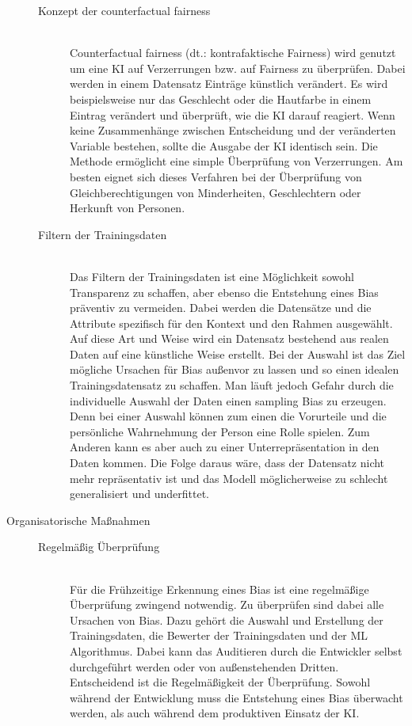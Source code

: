 \begin{onehalfspace}
\begin{description}
\begin{description}
                \item[Konzept der \glqq{}counterfactual fairness\grqq{}] \hfill \\
                \glqq{}Counterfactual fairness\grqq{} (\ac*{dt}.: kontrafaktische Fairness) wird genutzt um eine \ac*{KI} auf Verzerrungen bzw. auf Fairness zu überprüfen. Dabei werden in einem Datensatz Einträge künstlich verändert. Es wird beispielsweise nur das Geschlecht oder die Hautfarbe in einem Eintrag verändert und überprüft, wie die \ac*{KI} darauf reagiert. Wenn keine Zusammenhänge zwischen Entscheidung und der veränderten Variable bestehen, sollte die Ausgabe der \ac*{KI} identisch sein. Die Methode ermöglicht eine simple Überprüfung von Verzerrungen. Am besten eignet sich dieses Verfahren bei der Überprüfung von Gleichberechtigungen von Minderheiten, Geschlechtern oder Herkunft von Personen.\cite{hagendorff2019maschinelles}

                \item[Filtern der Trainingsdaten] \hfill \\
                Das Filtern der Trainingsdaten ist eine Möglichkeit sowohl Transparenz zu schaffen, aber ebenso die Entstehung eines Bias präventiv zu vermeiden. Dabei werden die Datensätze und die Attribute spezifisch für den Kontext und den Rahmen ausgewählt. Auf diese Art und Weise wird ein Datensatz bestehend aus realen Daten auf eine künstliche Weise erstellt. Bei der Auswahl ist das Ziel mögliche Ursachen für Bias au{\ss}envor zu lassen und so einen idealen Trainingsdatensatz zu schaffen.
                Man läuft jedoch Gefahr durch die individuelle Auswahl der Daten einen sampling Bias zu erzeugen. Denn bei einer Auswahl können zum einen die Vorurteile und die persönliche Wahrnehmung der Person eine Rolle spielen. Zum Anderen kann es aber auch zu einer Unterrepräsentation in den Daten kommen. Die Folge daraus wäre, dass der Datensatz nicht mehr repräsentativ ist und das Modell möglicherweise zu schlecht generalisiert und underfittet.\cite{Google}\cite{ntoutsi2020bias}

            \end{description}

            \item[Organisatorische Maßnahmen] \hfill
            \begin{description}
                \item [Regelmäßig Überprüfung] \hfill \\
                Für die Frühzeitige Erkennung eines Bias ist eine regelmäßige Überprüfung zwingend notwendig. Zu überprüfen sind dabei alle Ursachen von Bias. Dazu gehört die Auswahl und Erstellung der Trainingsdaten, die Bewerter der Trainingsdaten und der \ac{ML} Algorithmus. 
                Dabei kann das Auditieren durch die Entwickler selbst durchgeführt werden oder von au{\ss}enstehenden Dritten. Entscheidend ist die Regelmäßigkeit der Überprüfung. Sowohl während der Entwicklung muss die Entstehung eines Bias überwacht werden, als auch während dem produktiven Einsatz der \ac{KI}.\cite{Drew2019}\cite{hagendorff2019maschinelles}\cite{Dilmegani2020}\cite{Google}


\end{description}
\end{description}
\end{onehalfspace}

